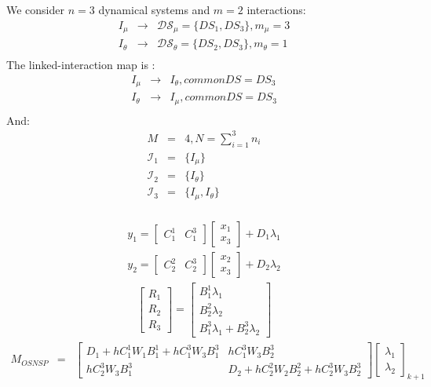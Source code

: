 \documentclass[10pt]{report}
\begin{document}
We consider $n=3$ dynamical systems and $m=2$ interactions: 
\begin{eqnarray*}
I_{\mu}& \rightarrow& \mathcal{DS}_{\mu} = \{DS_1, DS_3\}, m_{\mu} = 3 \\
I_{\theta}&\rightarrow& \mathcal{DS}_{\theta} = \{DS_2, DS_3\}, m_{\theta} = 1  \\
\end{eqnarray*}
The linked-interaction map is :
\begin{eqnarray*}
I_{\mu} &\rightarrow& I_{\theta}, commonDS = DS_3 \\
I_{\theta} &\rightarrow&I_{\mu}, commonDS = DS_3 \\
\end{eqnarray*}
And:
\begin{eqnarray*}
M &=& 4, N = \displaystyle{\sum_{i=1}^{3} n_i} \\
\mathcal{I}_1 &=& \{I_{\mu} \}\\
\mathcal{I}_2 &=& \{I_{\theta}\} \\
\mathcal{I}_3 &=& \{I_{\mu}, I_{\theta}\} \\
\end{eqnarray*}

\begin{eqnarray}
y_1 = \left[\begin{array}{ccc} 
C_1^1 & C_1^3 \end{array}\right]
\left[\begin{array}{c}
x_1 \\
x_3 
\end{array}\right]
+ D_1\lambda_1 \\
y_2 = \left[\begin{array}{ccc} 
C_2^2 & C_2^3 \end{array}\right]
\left[\begin{array}{c}
x_2 \\
x_3 
\end{array}\right]
+ D_2\lambda_2 
\end{eqnarray}
%
\begin{eqnarray}
\left[\begin{array}{c}
R_1 \\
R_2 \\
R_3 \end{array}\right]=
\left[\begin{array}{c}
B_1^1\lambda_1  \\
B_2^2\lambda_2  \\
B_1^3\lambda_1 + B_2^3\lambda_2
\end{array}\right]
\end{eqnarray}
%
\begin{eqnarray}
M_{OSNSP} &=& \left[\begin{array}{cc} 
D_1+hC_1^1W_1B_1^1+hC_1^3W_3B_1^3 & hC_1^3W_3B_2^3 \\
hC_2^3W_3B_1^3 & D_2+hC_2^2W_2B_2^2+hC_2^3W_3B_2^3 
\end{array}\right]\left[\begin{array}{c} 
\lambda_1  \\
\lambda_2
\end{array}\right]_{k+1} 
\end{eqnarray}
\end{document}
